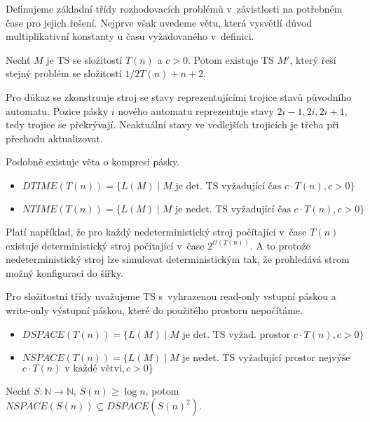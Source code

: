 Definujeme základní třídy rozhodovacích problémů v~závistlosti
na potřebném čase pro jejich řešení. Nejprve však uvedeme větu, která
vysvětlí důvod multiplikativní konstanty u času vyžadovaného v~definici.

\begin{theorem}
    Nechť $M$ je TS se složitostí $T(n)$ a $c > 0$.
    Potom existuje TS $M'$, který řeší stejný problém
    se složitostí $1/2 T(n) + n + 2$.
\end{theorem}

Pro důkaz se zkonstruuje stroj se stavy reprezentujícími trojice stavů
původního automatu. Pozice pásky $i$ nového automatu reprezentuje stavy
$2i-1, 2i, 2i+1$, tedy trojice se překrývají. Neaktuální stavy ve
vedlejších trojicích je třeba při přechodu aktualizovat.

Podobně existuje věta o kompresi pásky.

\begin{itemize}
    \item $DTIME(T(n)) = \{ L(M) \mid \text{$M$ je det. TS vyžadující
        čas $c \cdot T(n)$}, c > 0 \}$
    \item $NTIME(T(n)) = \{ L(M) \mid \text{$M$ je nedet. TS vyžadující
    čas } c \cdot T(n), c > 0 \}$
\end{itemize}

Platí například, že pro každý nedeterministický stroj počítající v~čase
$T(n)$ existuje deterministický stroj počítající v~čase
$2^{\mathcal{O}(T(n))}$. A to protože nedeterministický stroj lze
simulovat deterministickým tak, že prohledává strom možný konfigurací do
šířky.

Pro složitostní třídy uvažujeme TS s~vyhrazenou read-only vstupní páskou
a write-only výstupní páskou, které do použitého prostoru nepočítáme.

\begin{itemize}
    \item $DSPACE(T(n)) = \{ L(M) \mid \text{$M$ je det. TS vyžad.
        prostor } c \cdot T(n), c > 0 \}$
    \item $NSPACE(T(n)) = \{ L(M) \mid \text{$M$ je nedet. TS vyžadující
        prostor nejvýše}$ $c \cdot T(n) \text{ v~každé větvi}, c > 0 \}$
\end{itemize}

\begin{theorem}[Savitch]
    Nechť $S : \mathbb{N} \to \mathbb{N}$, $S(n) \geq \log n$,
    potom $NSPACE(S(n)) \subseteq DSPACE(S(n)^2)$.
\end{theorem}

